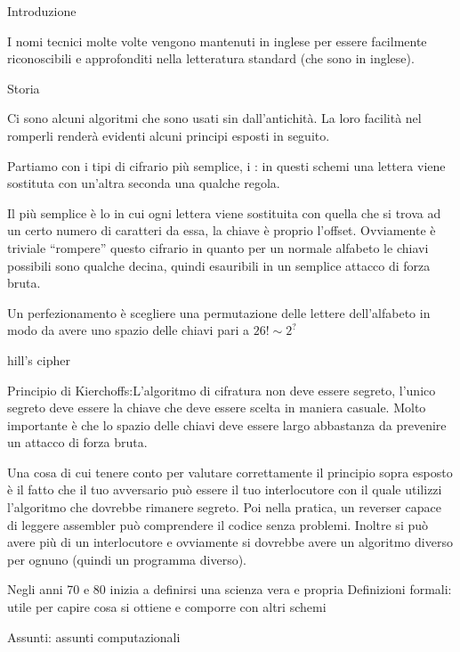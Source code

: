 

\readtocfile

\capitolo Introduzione

I nomi tecnici molte volte vengono mantenuti in inglese per essere facilmente
riconoscibili e approfonditi nella letteratura standard (che sono in inglese).

\sezione Storia

Ci sono alcuni algoritmi che sono usati sin dall'antichit\`a. La loro facilit\`a nel
romperli render\`a evidenti alcuni principi esposti in seguito.

Partiamo con i tipi di cifrario pi\`u semplice, i :
in questi schemi una lettera viene sostituta con un'altra seconda una qualche regola.

Il pi\`u semplice \`e lo  in cui ogni lettera viene sostituita
con quella che si trova ad un certo numero di caratteri da essa, la chiave \`e proprio
l'offset. Ovviamente \`e triviale ``rompere'' questo cifrario in quanto per un normale
alfabeto le chiavi possibili sono qualche decina, quindi esauribili in un semplice
attacco di forza bruta.

Un perfezionamento \`e scegliere una permutazione delle lettere dell'alfabeto in modo
da avere uno spazio delle chiavi pari a $26!\sim 2^?$

\todo hill's cipher

\ddefinizione Principio di Kierchoffs:L'algoritmo di cifratura non deve essere segreto,
l'unico segreto deve essere la chiave che deve essere scelta in maniera casuale. Molto
importante \`e che lo spazio delle chiavi deve essere largo abbastanza da prevenire
un attacco di forza bruta.

Una cosa di cui tenere conto per valutare correttamente il principio sopra esposto \`e
il fatto che il tuo avversario pu\`o essere il tuo interlocutore con il quale utilizzi
l'algoritmo che dovrebbe rimanere segreto. Poi nella pratica, un reverser capace di leggere
assembler pu\`o comprendere il codice senza problemi. Inoltre si pu\`o avere pi\`u di un interlocutore e ovviamente
si dovrebbe avere un algoritmo diverso per ognuno (quindi un programma diverso).

Negli anni 70 e 80 inizia a definirsi una scienza vera e propria
\medskip
\voce Definizioni formali: utile per capire cosa si ottiene e comporre con altri schemi

\voce Assunti: assunti computazionali

